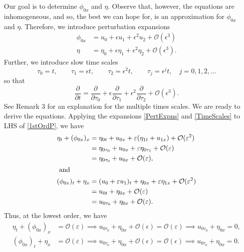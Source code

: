 \documentclass[10pt,reqno,oneside,a4paper]{article}
\begin{document}
Our goal is to determine $\phi_{0x}$ and $\eta.$ Observe that, however, the equations are inhomogeneous, and so, the best we can hope for, is an approximation for $\phi_{0x}$ and $\eta.$ Therefore, we introduce perturbation expansions
\begin{subequations} \label{PertExpns}
\begin{align}
\phi_{0x} &= u_0 + \epsilon u_1 + \epsilon^2 u_2 + \mathcal{O}(\epsilon^3) \\
\eta &= \eta_0 + \epsilon \eta_1 + \epsilon^2 \eta_2 + \mathcal{O}(\epsilon^3).
\end{align}
\end{subequations}
Further, we introduce slow time scales 
\[ 
\tau_0 = t, \qquad \tau_1 = \epsilon t, \qquad \tau_2 = \epsilon^2 t, \qquad \tau_j = \epsilon^j t, \quad j = 0,1,2,  \ldots
\]
so that 
\begin{equation}\label{TimeScales}
\frac{\partial}{\partial t} = \frac{\partial}{\partial \tau_0} +  \epsilon\frac{\partial}{\partial \tau_1} + \epsilon^2 \frac{\partial}{\partial \tau_2} + \mathcal{O}(\epsilon^3). 
\end{equation}
See Remark 3 for an explanation for the multiple times scales. We are ready to derive the equations. Applying the expansions \eqref{PertExpns} and \eqref{TimeScales} to LHS of \eqref{1stOrdP}, we have
\begin{align*}
\eta_{t} + (\phi_{0x})_x &= \eta_{0t} + u_{0x} + \epsilon (\eta_{1t}+ u_{1x}) + \mathcal{O}(\epsilon^2) \\
&= \eta_{0\tau_0} + u_{0x} + \epsilon \eta_{0\tau_1} + \mathcal{O}(\epsilon) \\
&= \eta_{0\tau_0} + u_{0x} + \mathcal{O}(\epsilon), \\
\intertext{ and }
(\phi_{0x})_t + \eta_x &= (u_0 + \epsilon u_1)_t + \eta_{0x} + \epsilon \eta_{1x} + \mathcal{O}(\epsilon^2) \\
&= u_{0t} + \eta_{0x} + \mathcal{O}(\epsilon) \\
&= u_{0\tau_0} + \eta_{0x} + \mathcal{O}(\epsilon).
\end{align*}
Thus, at the lowest order, we have
\begin{align*}
\eta_{t}  +  (\phi_{0x})_x &= \mathcal{O}(\varepsilon) \implies u_{0\tau_0} + \eta_{0x} + \mathcal{O}(\epsilon)= \mathcal{O}(\varepsilon) \implies u_{0\tau_0} + \eta_{0x} = 0, \\
(\phi_{0x})_t + \eta_x &= \mathcal{O}(\varepsilon) \implies u_{0\tau_0} + \eta_{0x} + \mathcal{O}(\epsilon) = \mathcal{O}(\epsilon) \implies u_{0\tau_0} + \eta_{0x} = 0.
\end{align*}
\end{document}
